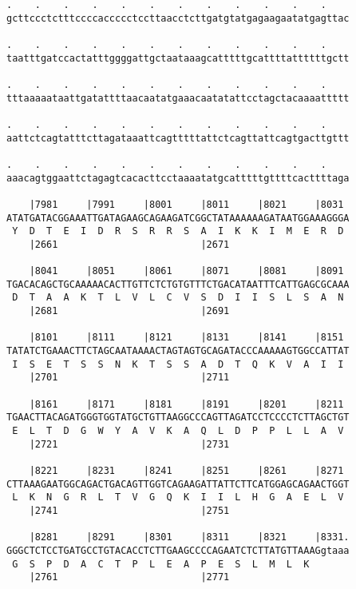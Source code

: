 \documentclass{article}
\begin{document}
\begin{Verbatim}
.    .    .    .    .    .    .    .    .    .    .    .    
gcttccctctttccccaccccctccttaacctcttgatgtatgagaagaatatgagttac
                                                            
.    .    .    .    .    .    .    .    .    .    .    .    
taatttgatccactatttggggattgctaataaagcatttttgcattttattttttgctt
                                                            
.    .    .    .    .    .    .    .    .    .    .    .    
tttaaaaataattgatattttaacaatatgaaacaatatattcctagctacaaaattttt
                                                            
.    .    .    .    .    .    .    .    .    .    .    .    
aattctcagtatttcttagataaattcagtttttattctcagttattcagtgacttgttt
                                                            
.    .    .    .    .    .    .    .    .    .    .    .    
aaacagtggaattctagagtcacacttcctaaaatatgcatttttgttttcacttttaga
                                                            
    |7981     |7991     |8001     |8011     |8021     |8031 
ATATGATACGGAAATTGATAGAAGCAGAAGATCGGCTATAAAAAAGATAATGGAAAGGGA
 Y  D  T  E  I  D  R  S  R  R  S  A  I  K  K  I  M  E  R  D 
    |2661                         |2671                     
  
    |8041     |8051     |8061     |8071     |8081     |8091 
TGACACAGCTGCAAAAACACTTGTTCTCTGTGTTTCTGACATAATTTCATTGAGCGCAAA
 D  T  A  A  K  T  L  V  L  C  V  S  D  I  I  S  L  S  A  N 
    |2681                         |2691                     
  
    |8101     |8111     |8121     |8131     |8141     |8151 
TATATCTGAAACTTCTAGCAATAAAACTAGTAGTGCAGATACCCAAAAAGTGGCCATTAT
 I  S  E  T  S  S  N  K  T  S  S  A  D  T  Q  K  V  A  I  I 
    |2701                         |2711                     
  
    |8161     |8171     |8181     |8191     |8201     |8211 
TGAACTTACAGATGGGTGGTATGCTGTTAAGGCCCAGTTAGATCCTCCCCTCTTAGCTGT
 E  L  T  D  G  W  Y  A  V  K  A  Q  L  D  P  P  L  L  A  V 
    |2721                         |2731                     
  
    |8221     |8231     |8241     |8251     |8261     |8271 
CTTAAAGAATGGCAGACTGACAGTTGGTCAGAAGATTATTCTTCATGGAGCAGAACTGGT
 L  K  N  G  R  L  T  V  G  Q  K  I  I  L  H  G  A  E  L  V 
    |2741                         |2751                     
  
    |8281     |8291     |8301     |8311     |8321     |8331.
GGGCTCTCCTGATGCCTGTACACCTCTTGAAGCCCCAGAATCTCTTATGTTAAAGgtaaa
 G  S  P  D  A  C  T  P  L  E  A  P  E  S  L  M  L  K       
    |2761                         |2771                     
  

\end{Verbatim}
\end{document}
